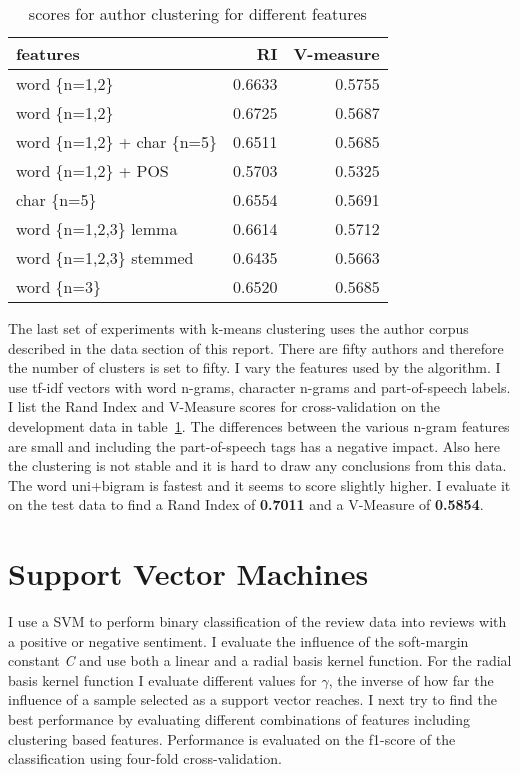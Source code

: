 \documentclass[11pt]{article}
\begin{document}
\begin{table}[ht]\footnotesize
\centering
\caption{scores for author clustering for different features}
\label{tab:authors}
\begin{tabular}{ l r r }
features & RI & V-measure \\
\hline
word \{n=1,2\}            & 0.6633 & 0.5755 \\
word \{n=1,2\}            & 0.6725 & 0.5687 \\
word \{n=1,2\} + char \{n=5\} & 0.6511 & 0.5685 \\
word \{n=1,2\} + POS      & 0.5703 & 0.5325 \\
char \{n=5\}              & 0.6554 & 0.5691 \\
word \{n=1,2,3\} lemma    & 0.6614 & 0.5712 \\
word \{n=1,2,3\} stemmed  & 0.6435 & 0.5663 \\
word \{n=3\}              & 0.6520 & 0.5685 \\
\end{tabular}
\end{table}

The last set of experiments with k-means clustering uses the author corpus described in the data section of this report. There are fifty authors and therefore the number of clusters is set to fifty. I vary the features used by the algorithm. I use tf-idf vectors with word n-grams, character n-grams and part-of-speech labels. I list the Rand Index and V-Measure scores for cross-validation on the development data in table~\ref{tab:authors}. The differences between the various n-gram features are small and including the part-of-speech tags has a negative impact. Also here the clustering is not stable and it is hard to draw any conclusions from this data. The word uni+bigram is fastest and it seems to score slightly higher. I evaluate it on the test data to find a Rand Index of \textbf{0.7011} and a V-Measure of \textbf{0.5854}.

\section{Support Vector Machines}

I use a SVM to perform binary classification of the review data into reviews with a positive or negative sentiment. I evaluate the influence of the soft-margin constant \emph{C} and use both a linear and a radial basis kernel function. For the radial basis kernel function I evaluate different values for \emph{$\gamma$}, the inverse of how far the influence of a sample selected as a support vector reaches. I next try to find the best performance by evaluating different combinations of features including clustering based features. Performance is evaluated on the f1-score of the classification using four-fold cross-validation.
\end{document}
